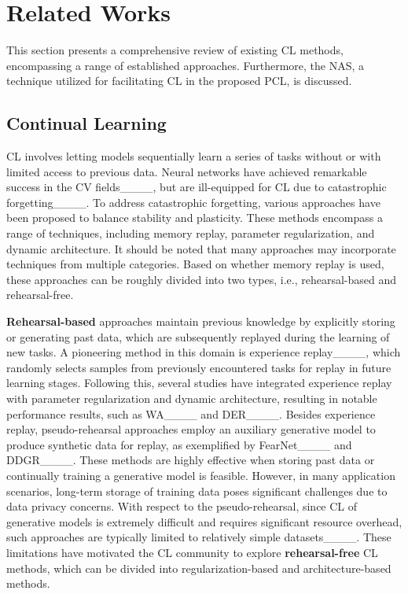 \section{Related Works}
This section presents a comprehensive review of existing CL methods, encompassing a range of established approaches. Furthermore, the NAS, a technique utilized for facilitating CL in the proposed PCL, is discussed.

\subsection{Continual Learning}

CL involves letting models sequentially learn a series of tasks without or with limited access to previous data. Neural networks have achieved remarkable success in the CV fields____, but are ill-equipped for CL due to catastrophic forgetting____. To address catastrophic forgetting, various approaches have been proposed to balance stability and plasticity. These methods encompass a range of techniques, including memory replay, parameter regularization, and dynamic architecture. It should be noted that many approaches may incorporate techniques from multiple categories. Based on whether memory replay is used, these approaches can be roughly divided into two types, i.e., rehearsal-based and rehearsal-free.

\textbf{Rehearsal-based} approaches maintain previous knowledge by explicitly storing or generating past data, which are subsequently replayed during the learning of new tasks. A pioneering method in this domain is experience replay____, which randomly selects samples from previously encountered tasks for replay in future learning stages. Following this, several studies have integrated experience replay with parameter regularization and dynamic architecture, resulting in notable performance results, such as WA____ and DER____. Besides experience replay, pseudo-rehearsal approaches employ an auxiliary generative model to produce synthetic data for replay, as exemplified by FearNet____ and DDGR____. These methods are highly effective when storing past data or continually training a generative model is feasible. However, in many application scenarios, long-term storage of training data poses significant challenges due to data privacy concerns. With respect to the pseudo-rehearsal, since CL of generative models is extremely difficult and requires significant resource overhead, such approaches are typically limited to relatively simple datasets____. These limitations have motivated the CL community to explore \textbf{rehearsal-free} CL methods, which can be divided into regularization-based and architecture-based methods.

